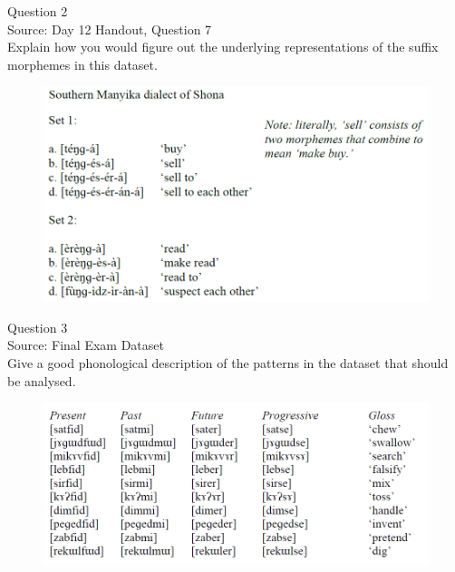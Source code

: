 \documentclass[12pt]{article}
\begin{document}
\newpage

{\large Question 2}\\

Source: Day 12 Handout, Question 7\\

Explain how you would figure out the underlying representations of the suffix morphemes in this dataset.\\

\begin{figure}[H]
\includegraphics{../images/shona.png}
\end{figure}

\newpage

{\large Question 3}\\

Source: Final Exam Dataset\\

Give a good phonological description of the patterns in the dataset that should be analysed.\\

\begin{figure}[H]
\includegraphics{../images/final_dataset.png}
\end{figure}

\newpage
\end{document}

